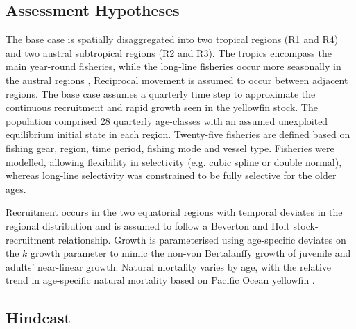 \documentclass[11pt,a4paper]{article}
\begin{document}
{\subsection{Assessment Hypotheses}

The base case is spatially disaggregated into two tropical regions (R1 and R4) and two austral subtropical regions (R2 and R3). The tropics encompass the main year-round fisheries, while the long-line fisheries occur more seasonally in the austral regions \citep{langley2015yft}, Reciprocal movement is assumed to occur between adjacent regions. The base case assumes a quarterly time step to approximate the continuous recruitment and rapid growth seen in the yellowfin stock. The population comprised 28 quarterly age-classes with an assumed unexploited equilibrium initial state in each region. Twenty-five fisheries are defined based on fishing gear, region, time period, fishing mode and vessel type. Fisheries were modelled, allowing flexibility in selectivity (e.g. cubic spline or double normal), whereas long-line selectivity was constrained to be fully selective for the older ages. 

Recruitment occurs in the two equatorial regions with temporal deviates in the regional distribution and is assumed to follow a Beverton and Holt stock-recruitment relationship. %
Growth is parameterised using age-specific deviates on the $k$ growth parameter to mimic the non-von Bertalanffy growth of juvenile and adults' near-linear growth. Natural mortality varies by age, with the relative trend in age-specific natural mortality based on Pacific Ocean yellowfin \citep{maunder2012review}. 



\subsection{Hindcast}

}
\end{document}

